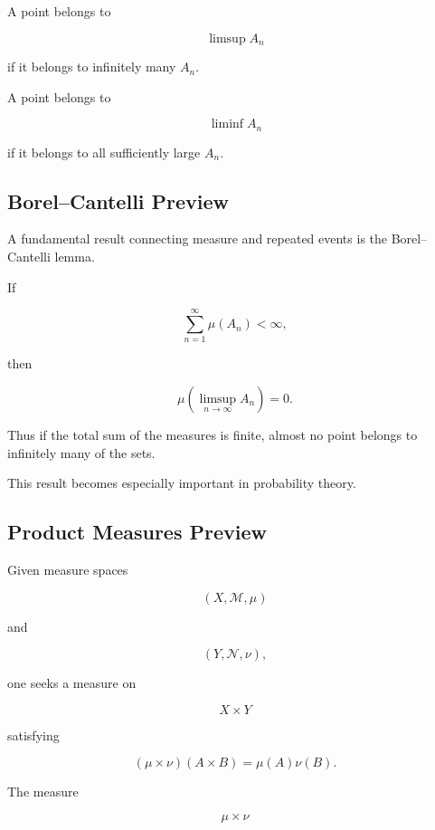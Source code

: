 A point belongs to

\[
\limsup A_n
\]

if it belongs to infinitely many \(A_n\).

A point belongs to

\[
\liminf A_n
\]

if it belongs to all sufficiently large \(A_n\).

\subsection{Borel--Cantelli Preview}
\label{subsec:borel-cantelli-preview}

A fundamental result connecting measure and repeated events is the
Borel--Cantelli lemma.

\begin{theorem}
If

\[
\sum_{n=1}^{\infty}\mu(A_n)<\infty,
\]

then

\[
\boxed{
\mu\left(
\limsup_{n\to\infty}A_n
\right)=0.
}
\]
\end{theorem}

Thus if the total sum of the measures is finite, almost no point belongs to
infinitely many of the sets.

This result becomes especially important in probability theory.

\subsection{Product Measures Preview}
\label{subsec:product-measures-preview}

Given measure spaces

\[
(X,\mathcal{M},\mu)
\]

and

\[
(Y,\mathcal{N},\nu),
\]

one seeks a measure on

\[
X\times Y
\]

satisfying

\[
\boxed{
(\mu\times\nu)(A\times B)
=
\mu(A)\nu(B).
}
\]

The measure

\[
\mu\times\nu
\]

